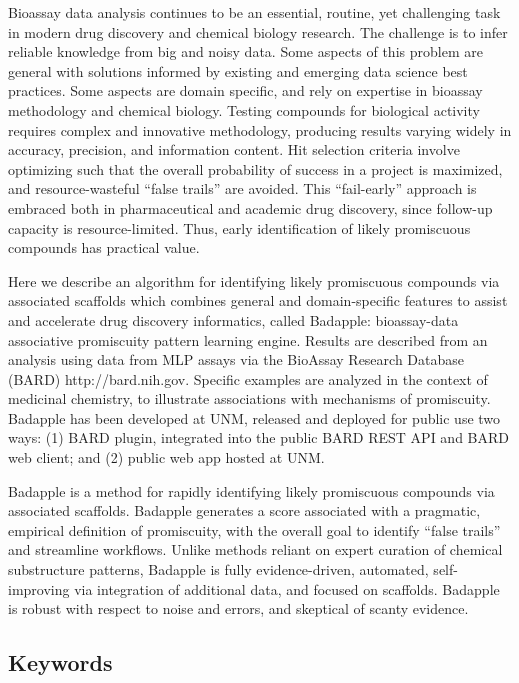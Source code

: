 Bioassay data analysis continues to be an essential, routine, yet challenging task in modern drug discovery and chemical biology research. The challenge is to infer reliable knowledge from big and noisy data. Some aspects of this problem are general with solutions informed by existing and emerging data science best practices. Some aspects are domain specific, and rely on expertise in bioassay methodology and chemical biology. Testing compounds for biological activity requires complex and innovative methodology, producing results varying widely in accuracy, precision, and information content. Hit selection criteria involve optimizing such that the overall probability of success in a project is maximized, and resource-wasteful “false trails” are avoided. This “fail-early” approach is embraced both in pharmaceutical and academic drug discovery, since follow-up capacity is resource-limited. Thus, early identification of likely promiscuous compounds has practical value.

Here we describe an algorithm for identifying likely promiscuous compounds via associated scaffolds which combines general and domain-specific features to assist and accelerate drug discovery informatics, called Badapple: bioassay-data associative promiscuity pattern learning engine. Results are described from an analysis using data from MLP assays via the BioAssay Research Database (BARD) http://bard.nih.gov. Specific examples are analyzed in the context of medicinal chemistry, to illustrate associations with mechanisms of promiscuity. Badapple has been developed at UNM, released and deployed for public use two ways: (1) BARD plugin, integrated into the public BARD REST API and BARD web client; and (2) public web app hosted at UNM.

Badapple is a method for rapidly identifying likely promiscuous compounds via associated scaffolds. Badapple generates a score associated with a pragmatic, empirical definition of promiscuity, with the overall goal to identify “false trails” and streamline workflows. Unlike methods reliant on expert curation of chemical substructure patterns, Badapple is fully evidence-driven, automated, self-improving via integration of additional data, and focused on scaffolds. Badapple is robust with respect to noise and errors, and skeptical of scanty evidence.

\subsection{Keywords}

